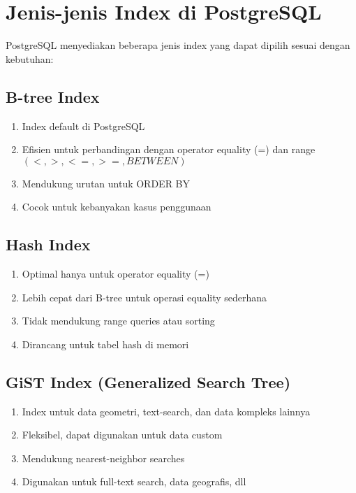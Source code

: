 \section{Jenis-jenis Index di PostgreSQL}

PostgreSQL menyediakan beberapa jenis index yang dapat dipilih sesuai dengan kebutuhan:

\subsection{B-tree Index}
\begin{enumerate}
    \item Index default di PostgreSQL
    \item Efisien untuk perbandingan dengan operator equality (=) dan range $(<, >, <=, >=, BETWEEN)$
    \item Mendukung urutan untuk ORDER BY
    \item Cocok untuk kebanyakan kasus penggunaan
\end{enumerate}

\subsection{Hash Index}
\begin{enumerate}
    \item Optimal hanya untuk operator equality (=)
    \item Lebih cepat dari B-tree untuk operasi equality sederhana
    \item Tidak mendukung range queries atau sorting
    \item Dirancang untuk tabel hash di memori
\end{enumerate}

\subsection{GiST Index (Generalized Search Tree)}
\begin{enumerate}
    \item Index untuk data geometri, text-search, dan data kompleks lainnya
    \item Fleksibel, dapat digunakan untuk data custom
    \item Mendukung nearest-neighbor searches
    \item Digunakan untuk full-text search, data geografis, dll
\end{enumerate}

